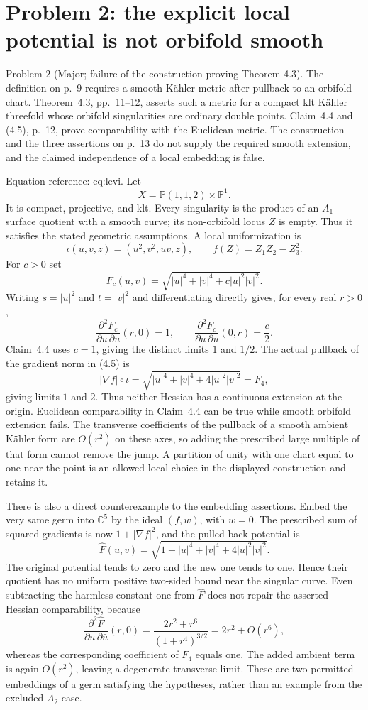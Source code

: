\documentclass[10pt]{article}
\begin{document}
\section*{Problem 2: the explicit local potential is not orbifold smooth}
Problem 2 (Major; failure of the construction proving Theorem 4.3).  The definition on p. 9 requires a smooth Kähler metric after pullback to an orbifold chart. Theorem 4.3, pp. 11–12, asserts such a metric for a compact klt Kähler threefold whose orbifold singularities are ordinary double points. Claim 4.4 and (4.5), p. 12, prove comparability with the Euclidean metric. The construction and the three assertions on p. 13 do not supply the required smooth extension, and the claimed independence of a local embedding is false.\par
Equation reference: eq:levi. Let \[X=\mathbb P(1,1,2)\times\mathbb P^1.\] It is compact, projective, and klt. Every singularity is the product of an \(A_1\) surface quotient with a smooth curve; its non-orbifold locus \(Z\) is empty. Thus it satisfies the stated geometric assumptions. A local uniformization is \[\iota(u,v,z)=(u^2,v^2,uv,z),\qquad
 f(Z)=Z_1Z_2-Z_3^2.\] For \(c>0\) set \[F_c(u,v)=\sqrt{|u|^4+|v|^4+c|u|^2|v|^2}.\] Writing \(s=|u|^2\) and \(t=|v|^2\) and differentiating directly gives, for every real \(r>0\), \[
 \frac{\partial^2 F_c}{\partial u\,\partial\bar u}(r,0)=1,
 \qquad
 \frac{\partial^2 F_c}{\partial u\,\partial\bar u}(0,r)=\frac c2.\] Claim 4.4 uses \(c=1\), giving the distinct limits \(1\) and \(1/2\). The actual pullback of the gradient norm in (4.5) is \[|\nabla f|\circ\iota
 =\sqrt{|u|^4+|v|^4+4|u|^2|v|^2}=F_4,\] giving limits \(1\) and \(2\). Thus neither Hessian has a continuous extension at the origin. Euclidean comparability in Claim 4.4 can be true while smooth orbifold extension fails. The transverse coefficients of the pullback of a smooth ambient Kähler form are \(O(r^2)\) on these axes, so adding the prescribed large multiple of that form cannot remove the jump. A partition of unity with one chart equal to one near the point is an allowed local choice in the displayed construction and retains it.\par
There is also a direct counterexample to the embedding assertions. Embed the very same germ into \(\mathbb C^5\) by the ideal \((f,w)\), with \(w=0\). The prescribed sum of squared gradients is now \(1+|\nabla f|^2\), and the pulled-back potential is \[\widehat F(u,v)=\sqrt{1+|u|^4+|v|^4+4|u|^2|v|^2}.\] The original potential tends to zero and the new one tends to one. Hence their quotient has no uniform positive two-sided bound near the singular curve. Even subtracting the harmless constant one from \(\widehat F\) does not repair the asserted Hessian comparability, because \[\frac{\partial^2\widehat F}{\partial u\,\partial\bar u}(r,0)
 =\frac{2r^2+r^6}{(1+r^4)^{3/2}}
 =2r^2+O(r^6),\] whereas the corresponding coefficient of \(F_4\) equals one. The added ambient term is again \(O(r^2)\), leaving a degenerate transverse limit. These are two permitted embeddings of a germ satisfying the hypotheses, rather than an example from the excluded \(A_2\) case.\par
\end{document}
